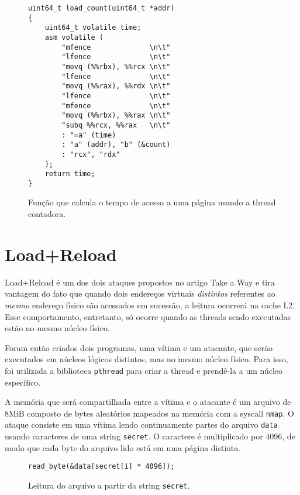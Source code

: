 \documentclass[twocolumn, 12pt]{article}
\begin{document}
\begin{figure}[h]
\begin{verbatim}
uint64_t load_count(uint64_t *addr)
{
	uint64_t volatile time;
	asm volatile (
		"mfence              \n\t"
		"lfence              \n\t"
		"movq (%%rbx), %%rcx \n\t"
		"lfence              \n\t"
		"movq (%%rax), %%rdx \n\t"
		"lfence              \n\t"
		"mfence              \n\t"
		"movq (%%rbx), %%rax \n\t"
		"subq %%rcx, %%rax   \n\t"
		: "=a" (time)
		: "a" (addr), "b" (&count)
		: "rcx", "rdx"
	);
	return time;
}
\end{verbatim}
\caption{Função que calcula o tempo de acesso a uma página usando a thread contadora.}
\end{figure}

%

\section{Load+Reload}

Load+Reload é um dos dois ataques
propostos no artigo Take a Way\cite{takeaway}
e tira vantagem do fato que
quando dois endereços virtuais \textit{distintos}
referentes ao \textit{mesmo} endereço físico
são acessados em sucessão,
a leitura ocorrerá na cache L2.
Esse comportamento, entretanto,
só ocorre quando as threads sendo executadas
estão no mesmo núcleo físico\cite{takeaway}.

Foram então criados dois programas,
uma vítima e um atacante,
que serão executados em núcleos lógicos distintos,
mas no mesmo núcleo físico.
Para isso, foi utilizada a biblioteca \texttt{pthread}
para criar a thread e
prendê-la a um núcleo específico.

A memória que será compartilhada
entre a vítima e o atacante
é um arquivo de 8MiB
composto de bytes aleatórios
mapeados na memória com a syscall \texttt{nmap}.
O ataque consiste em uma vítima
lendo continuamente partes do arquivo \texttt{data}
usando caracteres de uma string \texttt{secret}.
O caractere é multiplicado por 4096,
de modo que cada byte do arquivo lido
está em uma página distinta.
\begin{figure}
\begin{verbatim}
read_byte(&data[secret[i] * 4096]);
\end{verbatim}
\caption{Leitura do arquivo a partir da string \texttt{secret}.}
\end{figure}
\end{document}
